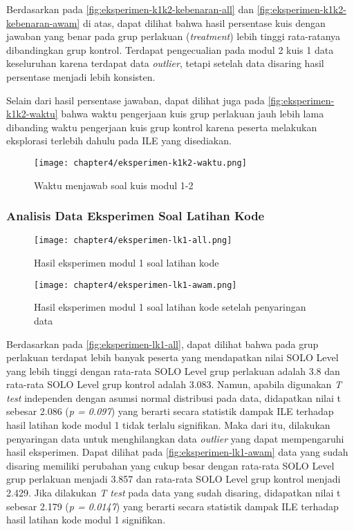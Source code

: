 Berdasarkan pada \autoref{fig:eksperimen-k1k2-kebenaran-all} dan \autoref{fig:eksperimen-k1k2-kebenaran-awam} di atas, dapat dilihat bahwa hasil persentase kuis dengan jawaban yang benar pada grup perlakuan (\textit{treatment}) lebih tinggi rata-ratanya dibandingkan grup kontrol. Terdapat pengecualian pada modul 2 kuis 1 data keseluruhan karena terdapat data \textit{outlier}, tetapi setelah data disaring hasil persentase menjadi lebih konsisten.

Selain dari hasil persentase jawaban, dapat dilihat juga pada \autoref{fig:eksperimen-k1k2-waktu} bahwa waktu pengerjaan kuis grup perlakuan jauh lebih lama dibanding waktu pengerjaan kuis grup kontrol karena peserta melakukan eksplorasi terlebih dahulu pada ILE yang disediakan.

\begin{figure}[H]
  \centering
  \texttt{[image: chapter4/eksperimen-k1k2-waktu.png]}
  \caption{Waktu menjawab soal kuis modul 1-2} \label{fig:eksperimen-k1k2-waktu}
\end{figure}

\subsubsection{Analisis Data Eksperimen Soal Latihan Kode}
\begin{figure}[H]
  \centering
  \texttt{[image: chapter4/eksperimen-lk1-all.png]}
  \caption{Hasil eksperimen modul 1 soal latihan kode} \label{fig:eksperimen-lk1-all}
\end{figure}
\begin{figure}[H]
  \centering
  \texttt{[image: chapter4/eksperimen-lk1-awam.png]}
  \caption{Hasil eksperimen modul 1 soal latihan kode setelah penyaringan data} \label{fig:eksperimen-lk1-awam}
\end{figure}

Berdasarkan pada \autoref{fig:eksperimen-lk1-all}, dapat dilihat bahwa pada grup perlakuan terdapat lebih banyak peserta yang mendapatkan nilai SOLO Level yang lebih tinggi dengan rata-rata SOLO Level grup perlakuan adalah 3.8 dan rata-rata SOLO Level grup kontrol adalah 3.083. Namun, apabila digunakan \textit{T test} independen dengan asumsi normal distribusi pada data, didapatkan nilai t sebesar 2.086 (\textit{p = 0.097}) yang berarti secara statistik dampak ILE terhadap hasil latihan kode modul 1 tidak terlalu signifikan. Maka dari itu, dilakukan penyaringan data untuk menghilangkan data \textit{outlier} yang dapat mempengaruhi hasil eksperimen. Dapat dilihat pada \autoref{fig:eksperimen-lk1-awam} data yang sudah disaring memiliki perubahan yang cukup besar dengan rata-rata SOLO Level grup perlakuan menjadi 3.857 dan rata-rata SOLO Level grup kontrol menjadi 2.429. Jika dilakukan \textit{T test} pada data yang sudah disaring, didapatkan nilai t sebesar 2.179 (\textit{p = 0.0147}) yang berarti secara statistik dampak ILE terhadap hasil latihan kode modul 1 signifikan.

